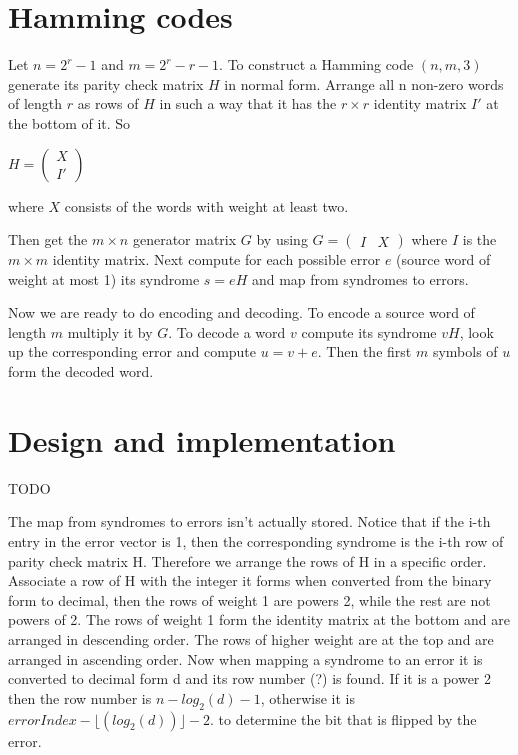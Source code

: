 \documentclass{article}
\begin{document}
\section{Hamming codes}

Let $n=2^r-1$ and $m=2^r-r-1$. To construct a Hamming code $(n, m, 3)$ generate its parity check matrix $H$ in normal form. Arrange all n non-zero words of length $r$ as rows of $H$ in such a way that it has the $r \times r$ identity matrix $I'$ at the bottom of it. So

\begin{center}
$
H =
\begin{pmatrix}
  X \\
  I'
\end{pmatrix}
$
\end{center}
where $X$ consists of the words with weight at least two.


Then get the $m \times n$ generator matrix $G$ by using
$
G =
\begin{pmatrix}
  I & X
\end{pmatrix}
$
where $I$ is the $m \times m$ identity matrix. Next compute for each possible error $e$ (source word of weight at most 1) its syndrome $s=eH$ and map from syndromes to errors.

Now we are ready to do encoding and decoding. To encode a source word of length $m$ multiply it by $G$. To decode a word $v$ compute its syndrome $vH$, look up the corresponding error and compute $u=v+e$. Then the first $m$ symbols of $u$ form the decoded word.


\section{Design and implementation}

TODO

The map from syndromes to errors isn't actually stored. Notice that if the i-th entry in the error vector is 1, then the corresponding syndrome is the i-th row of parity check matrix H. Therefore we arrange the rows of H in a specific order. Associate a row of H with the integer it forms when converted from the binary form to decimal, then the rows of weight 1 are powers 2, while the rest are not powers of 2. The rows of weight 1 form the identity matrix at the bottom and are arranged in descending order. The rows of higher weight are at the top and are arranged in ascending order. Now when mapping a syndrome to an error it is converted to decimal form d and its row number (?) is found. If it is a power 2 then the row number is $n - log_2(d) - 1$, otherwise it is $errorIndex - \lfloor(log_2(d))\rfloor - 2$.
 to determine the bit that is flipped by the error.
\end{document}
